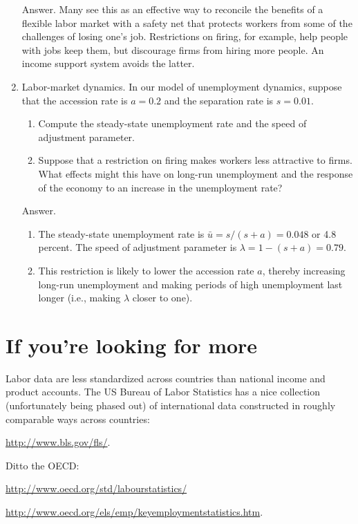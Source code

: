 \begin{enumerate}
Answer.  Many see this as an effective way to
reconcile the benefits of a flexible labor market
with a safety net that protects workers from some
of the challenges of losing one's job.
Restrictions on firing, for example, help people with jobs keep them,
but discourage firms from hiring more people.
An income support system avoids the latter.


\item Labor-market dynamics.
In our model of unemployment dynamics, suppose that the accession rate
 is
$a = 0.2$ and the separation rate is $s = 0.01$.
\begin{enumerate}
\item Compute the steady-state unemployment rate and the speed
of adjustment parameter.
\item Suppose that a restriction on firing makes workers less attractive to firms.
What effects might this have on long-run unemployment
and the response of the economy to an increase in the unemployment rate?
\end{enumerate}

Answer.
\begin{enumerate}
\item The steady-state unemployment rate is $\bar{u} = s/(s+a) = 0.048$
or 4.8 percent.
The speed of adjustment
 parameter is $\lambda = 1-(s+a) = 0.79$.
\item This restriction is likely to lower the accession rate
 $a$,
thereby increasing long-run unemployment and making periods of high unemployment
last longer (i.e., making $\lambda$ closer to one).
\end{enumerate}
\end{enumerate}


\section*{If you're looking for more}

Labor data are less standardized across countries than national
income and product accounts.
The US Bureau of Labor Statistics has a nice collection
(unfortunately being phased out)
of international data constructed in roughly comparable ways across countries:

\vspace*{\parskip}
\centerline{\url{http://www.bls.gov/fls/}.}

Ditto the {OECD}:

\vspace*{\parskip}
\centerline{\url{http://www.oecd.org/std/labourstatistics/}}
\centerline{\url{http://www.oecd.org/els/emp/keyemploymentstatistics.htm}.}

